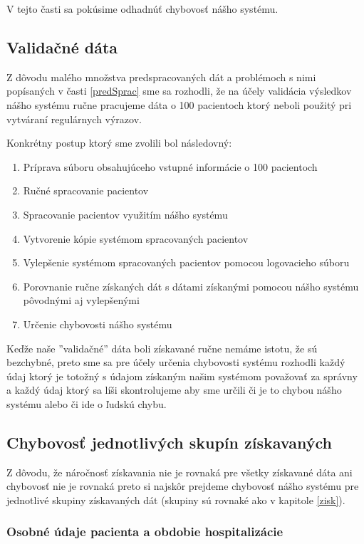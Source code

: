 V tejto časti sa pokúsime odhadnúť chybovosť nášho systému. 

\subsection{Validačné dáta}

Z dôvodu malého množstva predspracovaných dát a problémoch s nimi popísaných v časti \ref{predSprac} sme sa rozhodli, že na účely validácia výsledkov nášho systému ručne pracujeme dáta o 100 pacientoch ktorý neboli použitý pri vytváraní regulárnych výrazov.  

Konkrétny postup ktorý sme zvolili bol následovný:

\begin{enumerate}
	\item Príprava súboru obsahujúceho vstupné informácie o 100 pacientoch
	\item Ručné spracovanie pacientov
	\item Spracovanie pacientov využitím nášho systému
	\item Vytvorenie kópie systémom spracovaných pacientov
	\item Vylepšenie systémom spracovaných pacientov pomocou logovacieho súboru 
	\item Porovnanie ručne získaných dát s dátami získanými pomocou nášho systému pôvodnými aj vylepšenými
	\item Určenie chybovosti nášho systému   
\end{enumerate}

Keďže naše ''validačné'' dáta boli získavané ručne nemáme istotu, že sú bezchybné, preto sme sa pre účely určenia chybovosti systému rozhodli každý údaj ktorý je totožný s údajom získaným našim systémom považovať za správny a každý údaj ktorý sa líši skontrolujeme aby sme určili či je to chybou nášho systému alebo či ide o ľudskú chybu.


\subsection{Chybovosť jednotlivých skupín získavaných}

Z dôvodu, že náročnosť získavania nie je rovnaká pre všetky získavané dáta ani chybovosť nie je rovnaká preto si najskôr prejdeme chybovosť nášho systému pre jednotlivé skupiny získavaných dát (skupiny sú rovnaké ako v kapitole \ref{zisk}).

\subsubsection{Osobné údaje pacienta a obdobie hospitalizácie}


